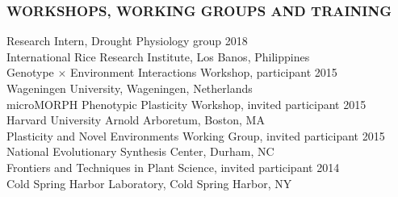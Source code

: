 \documentclass[12pt,english]{article}
\begin{document}
\subsubsection*{WORKSHOPS, WORKING GROUPS AND TRAINING}
\vspace{-0.5ex}
\hspace*{1.0em} Research Intern, Drought Physiology group
\hfill
2018
\vspace{1ex}\\
\hspace*{2.0em}  International Rice Research Institute, Los Banos, Philippines
\vspace{1ex}\\
\hspace*{1.0em} Genotype $\times$ Environment Interactions Workshop, participant
\hfill
2015
\vspace{1ex}\\
\hspace*{2.0em}  Wageningen University, Wageningen, Netherlands
\vspace{1ex}\\
\hspace*{1.0em} microMORPH Phenotypic Plasticity Workshop, invited participant
\hfill
2015
\vspace{1ex}\\
\hspace*{2.0em}  Harvard University Arnold Arboretum, Boston, MA
\vspace{1ex}\\
\hspace*{1.0em} Plasticity and Novel Environments Working Group, invited participant
\hfill
2015
\vspace{1ex}\\
\hspace*{2.0em}  National Evolutionary Synthesis Center, Durham, NC
\vspace{1ex}\\
\hspace*{1.0em} Frontiers and Techniques in Plant Science, invited participant
\hfill
2014
\vspace{1ex}\\
\hspace*{2.0em}  Cold Spring Harbor Laboratory, Cold Spring Harbor, NY
\vspace{1ex}

\end{document}
